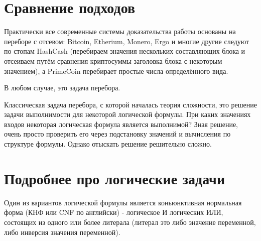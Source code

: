 \documentclass[acmlarge,screen]{acmart}
\begin{document}

%

%

%
\maketitle

\section{Сравнение подходов}

Практически все современные системы доказательства работы основаны на переборе с 
отсевом: Bitcoin, Etherium, Monero, Ergo и многие другие следуют по стопам HashCash 
(перебираем значения нескольких составляющих блока и отсеиваем путём сравнения криптосуммы 
заголовка блока с некоторым значением), а PrimeCoin перебирает простые числа определённого вида.

В любом случае, это задача перебора.

Классическая задача перебора, с которой началась теория сложности, это решение задачи выполнимости 
для некоторой логической формулы. При каких значениях входов некоторая логическая формула является выполнимой? 
Зная решение, очень просто проверить его через подстановку значений и вычисления по структуре формулы. 
Однако отыскать решение решительно сложно.

\section{Подробнее про логические задачи}

Один из вариантов логической формулы является коньюнктивная нормальная форма (КНФ или CNF по английски) - 
логическое И логических ИЛИ, состоящих из одного или более литерала (литерал это либо значение переменной, 
либо инверсия значения переменной).
\end{document}
